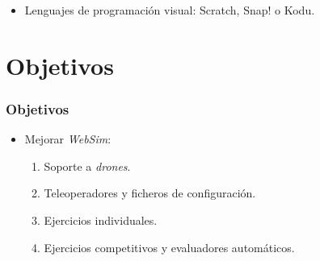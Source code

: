 \documentclass[xcolor={table}]{beamer}
\begin{document}
\begin{frame}
\begin{itemize}
\begin{figure}[H]
\begin{subfigure}{\textwidth}
        \label{fig:mbot}
        \end{subfigure}\hfill
            \label{fig:educativa}
        \end{figure}
        	\item Lenguajes de programación visual: Scratch, Snap! o Kodu.
  
		\end{itemize}
	\end{frame}

	\section{Objetivos}
		\begin{frame}
			\frametitle{Objetivos}
			\begin{itemize}\itemsep4pt
			    \item Mejorar \textit{WebSim}:
			    \begin{enumerate}\itemsep5pt
			        	\item Soporte a \textit{drones}.
				\item Teleoperadores y ficheros de configuración.
				\item Ejercicios individuales. 
				\item Ejercicios competitivos y evaluadores automáticos. 
			    \end{enumerate}{}
			
			\end{itemize}
		\end{frame}
\end{document}
